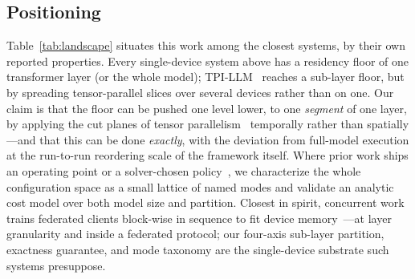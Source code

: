 \documentclass[journal]{IEEEtran}
\begin{document}
\subsection{Positioning}
Table~\ref{tab:landscape} situates this work among the closest systems, by
their own reported properties.
Every single-device system above has a residency floor of one transformer
layer (or the whole model); TPI-LLM~\cite{li2025tpillm} reaches a sub-layer
floor, but by spreading tensor-parallel slices over several devices rather
than on one. Our claim is that the floor can be pushed one
level lower, to one \emph{segment} of one layer, by applying the cut planes
of tensor parallelism~\cite{shoeybi2019megatron} temporally rather than
spatially---and that this can be done \emph{exactly}, with the deviation from
full-model execution at the run-to-run reordering scale of the framework
itself. Where prior work ships an operating point or a solver-chosen
policy~\cite{sheng2023flexgen}, we characterize the whole configuration space
as a small lattice of named modes and validate an analytic cost model over
both model size and partition. Closest in spirit, concurrent work trains
federated clients block-wise in sequence to fit device
memory~\cite{wu2026blockwise}---at layer granularity and inside a federated
protocol; our four-axis sub-layer partition, exactness guarantee, and
mode taxonomy are the single-device substrate such systems presuppose.
\end{document}
